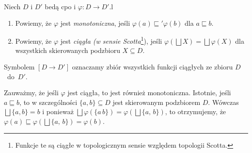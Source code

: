 \begin{definicja}\label{def:m_cont}%
Niech \(D\) i \(D'\) bedą cpo i \(\varphi: D\to D'\).l
\begin{enumerate}[label={(\alph*)}, ref={(\alph*)}] 
  \setlength\itemsep{0em}
\item Powiemy, że \(\varphi\) jest \emph{monotoniczna}, jeśli \(\varphi(a) \sqsubseteq' \varphi(b)\) dla \(a\sqsubseteq b\).
\item Powiemy, że \(\varphi\) jest \emph{ciągła (w sensie Scotta}\footnote{Funkcje te są ciągłe w topologicznym sensie względem topologii Scotta.}), jeśli \(\varphi(\bigsqcup X) = \bigsqcup \varphi (X)\) dla wszystkich skierowanych podzbioru \(X\subseteq D\).\label{def:m_cont_2}
\end{enumerate}
Symbolem \([D\to D']\) oznaczamy zbiór wszystkich funkcji ciągłych ze zbioru \(D\)~do~\(D'\).
\end{definicja}

\begin{uwaga*}
Zauważmy, że jeśli \(\varphi\) jest ciągła, to jest również monotoniczna. Istotnie, jeśli \(a\sqsubseteq b\), to w szczególności \(\{a, b\}\subseteq D\) jest skierowanym podzbiorem \(D\). Wówczas \(\bigsqcup\{a, b\}=b\) i ponieważ \(\bigsqcup \varphi(\{a\,b\})=\varphi(\bigsqcup\{a,\,b\})\), to otrzymujemy, że \(\varphi(a)\sqsubseteq \varphi(\bigsqcup\{a,\,b\}) = \varphi(b)\).
\end{uwaga*}

